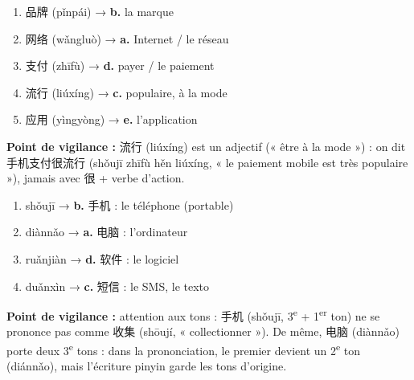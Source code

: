 \documentclass[11pt]{article}
\begin{document}
\begin{corrige}
\begin{enumerate}
\item 品牌 (pǐnpái) → \textbf{b.} la marque
\item 网络 (wǎngluò) → \textbf{a.} Internet / le réseau
\item 支付 (zhīfù) → \textbf{d.} payer / le paiement
\item 流行 (liúxíng) → \textbf{c.} populaire, à la mode
\item 应用 (yìngyòng) → \textbf{e.} l'application
\end{enumerate}
\textbf{Point de vigilance :} 流行 (liúxíng) est un adjectif (« être à la mode ») : on dit 手机支付很流行 (shǒujī zhīfù hěn liúxíng, « le paiement mobile est très populaire »), jamais avec 很 + verbe d'action.
\end{corrige}

\begin{corrige}
\begin{enumerate}
\item shǒujī → \textbf{b.} 手机 : le téléphone (portable)
\item diànnǎo → \textbf{a.} 电脑 : l'ordinateur
\item ruǎnjiàn → \textbf{d.} 软件 : le logiciel
\item duǎnxìn → \textbf{c.} 短信 : le SMS, le texto
\end{enumerate}
\textbf{Point de vigilance :} attention aux tons : 手机 (shǒujī, 3\textsuperscript{e} + 1\textsuperscript{er} ton) ne se prononce pas comme 收集 (shōují, « collectionner »). De même, 电脑 (diànnǎo) porte deux 3\textsuperscript{e} tons : dans la prononciation, le premier devient un 2\textsuperscript{e} ton (diánnǎo), mais l'écriture pinyin garde les tons d'origine.
\end{corrige}
\end{document}

